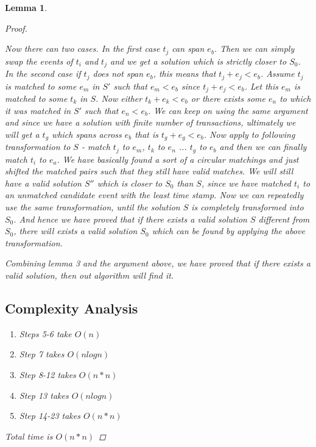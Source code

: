 \documentclass[12pt]{article}
\newtheorem{lemma}[theorem]{Lemma}
\begin{document}
\begin{lemma}
\begin{proof}
\begin{enumerate}
Now there can two cases. In the first case $t_j $ can span $e_b$. Then we can simply swap the events of $t_i$ and $t_j$ and we get a solution which is strictly closer to $S_0$.\\
In the second case if $t_j$ does not span $e_b$, this means that $ t_j + e_j < e_b$.  Assume $t_j$ is matched to some $e_m$ in $S'$ such that $e_m < e_b$ since $ t_j + e_j < e_b$. Let this $e_m$ is matched to some $t_k$ in $S$. Now either $t_k + e_k < e_b$ or there exists some $e_n$ to which it was matched in $S'$ such that $e_n < e_b$. We can keep on using the same argument and since we have a solution with finite number of transactions, ultimately we will get a $t_g$ which spans across $e_b$ that is $t_g + e_g < e_b$. Now apply to following transformation to $S$ - match $t_j$ to $e_m$, $t_k$ to $e_n$ ... $t_g$ to $e_b$ and then we can finally match $t_i$ to $e_a$. We have basically found a sort of a circular matchings and just shifted the matched pairs such that they still have valid matches. We will still have a valid solution $S''$ which is closer to $S_0$ than $S$, since we have matched $t_i$ to an unmatched candidate event with the least time stamp. Now we can repeatedly use the same transformation, until the solution $S$ is completely transformed into $S_0$. And hence we have proved that if there exists a valid solution $S$ different from $S_0$, there will exists a valid solution $S_0$ which can be found by applying the above transformation.
\end{enumerate}

Combining lemma 3 and the argument above, we have proved that if there exists a valid solution, then out algorithm will find it. 

\subsection{Complexity Analysis}
\begin{enumerate}
\item Steps 5-6 take $O(n)$
\item Step 7 takes $O(nlogn)$
\item Step 8-12 takes $O(n*n)$
\item Step 13 takes $O(nlogn)$
\item Step 14-23 takes $O(n*n)$
\end{enumerate}

Total time is $O(n*n)$


\end{proof}
\end{lemma}
\end{document}
